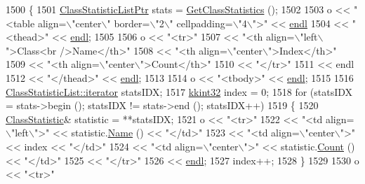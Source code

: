 \begin{DoxyCode}
1500 \{
1501   \hyperlink{class_k_k_m_l_l_1_1_class_statistic_list}{ClassStatisticListPtr}  stats = \hyperlink{class_k_k_m_l_l_1_1_feature_vector_list_a25d68202689dd6400dcf9a3b18fd5ad9}{GetClassStatistics} ();
1502 
1503   o << \textcolor{stringliteral}{"<table align=\(\backslash\)"center\(\backslash\)"  border=\(\backslash\)"2\(\backslash\)" cellpadding=\(\backslash\)"4\(\backslash\)">"}  << \hyperlink{namespace_k_k_b_ad1f50f65af6adc8fa9e6f62d007818a8}{endl}
1504     << \textcolor{stringliteral}{"<thead>"} << \hyperlink{namespace_k_k_b_ad1f50f65af6adc8fa9e6f62d007818a8}{endl};
1505 
1506   o << \textcolor{stringliteral}{"<tr>"}
1507     << \textcolor{stringliteral}{"<th align=\(\backslash\)"left\(\backslash\)">Class<br />Name</th>"}
1508     << \textcolor{stringliteral}{"<th align=\(\backslash\)"center\(\backslash\)">Index</th>"}
1509     << \textcolor{stringliteral}{"<th align=\(\backslash\)"center\(\backslash\)">Count</th>"}
1510     << \textcolor{stringliteral}{"</tr>"} 
1511     << endl
1512     << \textcolor{stringliteral}{"</thead>"} << \hyperlink{namespace_k_k_b_ad1f50f65af6adc8fa9e6f62d007818a8}{endl};
1513 
1514   o << \textcolor{stringliteral}{"<tbody>"} << \hyperlink{namespace_k_k_b_ad1f50f65af6adc8fa9e6f62d007818a8}{endl};
1515 
1516   \hyperlink{class_k_k_b_1_1_k_k_queue_aa3c2796a726eea468b94132a9fbf2cfe}{ClassStatisticList::iterator}  statsIDX;
1517   \hyperlink{namespace_k_k_b_a8fa4952cc84fda1de4bec1fbdd8d5b1b}{kkint32}  index = 0;
1518   \textcolor{keywordflow}{for}  (statsIDX = stats->begin (); statsIDX != stats->end ();  statsIDX++)
1519   \{
1520     \hyperlink{class_k_k_m_l_l_1_1_class_statistic}{ClassStatistic}& statistic = **statsIDX;
1521     o << \textcolor{stringliteral}{"<tr>"}
1522       << \textcolor{stringliteral}{"<td align=\(\backslash\)"left\(\backslash\)">"}    << statistic.\hyperlink{class_k_k_m_l_l_1_1_class_statistic_a7cf87217e07220c5269dbd9f6299bb43}{Name} ()  << \textcolor{stringliteral}{"</td>"}
1523       << \textcolor{stringliteral}{"<td align=\(\backslash\)"center\(\backslash\)">"}  << index              << \textcolor{stringliteral}{"</td>"} 
1524       << \textcolor{stringliteral}{"<td align=\(\backslash\)"center\(\backslash\)">"}  << statistic.\hyperlink{class_k_k_m_l_l_1_1_class_statistic_ace228f15b538c012781b4f6800c837c5}{Count} () << \textcolor{stringliteral}{"</td>"} 
1525       << \textcolor{stringliteral}{"</tr>"}
1526       << \hyperlink{namespace_k_k_b_ad1f50f65af6adc8fa9e6f62d007818a8}{endl};
1527     index++;
1528   \}
1529 
1530   o << \textcolor{stringliteral}{"<tr>"}

\end{DoxyCode}
